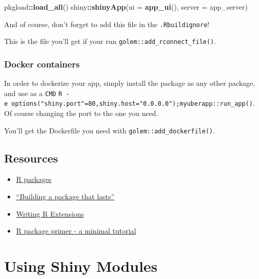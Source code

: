 \documentclass[]{book}
\newenvironment{Shaded}{\begin{snugshade}}{\end{snugshade}}
\newcommand{\DataTypeTok}[1]{\textcolor[rgb]{0.13,0.29,0.53}{#1}}
\newcommand{\KeywordTok}[1]{\textcolor[rgb]{0.13,0.29,0.53}{\textbf{#1}}}
\newcommand{\NormalTok}[1]{#1}
\newcommand{\OperatorTok}[1]{\textcolor[rgb]{0.81,0.36,0.00}{\textbf{#1}}}
\begin{document}
\begin{Shaded}
\begin{Highlighting}[]
\NormalTok{pkgload}\OperatorTok{::}\KeywordTok{load_all}\NormalTok{()}
\NormalTok{shiny}\OperatorTok{::}\KeywordTok{shinyApp}\NormalTok{(}\DataTypeTok{ui =} \KeywordTok{app_ui}\NormalTok{(), }\DataTypeTok{server =}\NormalTok{ app_server)}
\end{Highlighting}
\end{Shaded}

And of course, don't forget to add this file in the \texttt{.Rbuildignore}!

This is the file you'll get if your run \texttt{golem::add\_rconnect\_file()}.

\hypertarget{docker-containers}{%
\subsubsection{Docker containers}\label{docker-containers}}

In order to dockerize your app, simply install the package as any other package, and use as a \texttt{CMD} \texttt{R\ -e\ \textquotesingle{}options("shiny.port"=80,shiny.host="0.0.0.0");myuberapp::run\_app()\textquotesingle{}}. Of course changing the port to the one you need.

You'll get the Dockerfile you need with \texttt{golem::add\_dockerfile()}.

\hypertarget{resources}{%
\subsection{Resources}\label{resources}}

\begin{itemize}
\item
  \href{http://r-pkgs.had.co.nz/}{R packages}
\item
  \href{https://speakerdeck.com/colinfay/building-a-package-that-lasts-erum-2018-workshop}{``Building a package that lasts''}
\item
  \href{https://cran.r-project.org/doc/manuals/r-release/R-exts.html\#Creating-R-packages}{Writing R Extensions}
\item
  \href{https://kbroman.org/pkg_primer/}{R package primer - a minimal tutorial}
\end{itemize}

\hypertarget{using-shiny-modules}{%
\section{Using Shiny Modules}\label{using-shiny-modules}}
\end{document}
